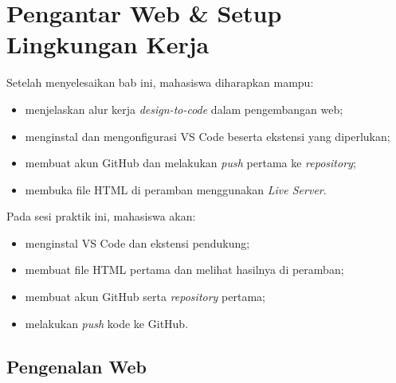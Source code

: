
\chapter{Pengantar Web \& Setup Lingkungan Kerja}
\label{chap:minggu-01}

\begin{capaian}
Setelah menyelesaikan bab ini, mahasiswa diharapkan mampu:
\begin{itemize}
  \item menjelaskan alur kerja \emph{design-to-code} dalam pengembangan web;
  \item menginstal dan mengonfigurasi VS Code beserta ekstensi yang diperlukan;
  \item membuat akun GitHub dan melakukan \emph{push} pertama ke \emph{repository};
  \item membuka file HTML di peramban menggunakan \emph{Live Server}.
\end{itemize}
\end{capaian}

\begin{tujuanpraktik}
Pada sesi praktik ini, mahasiswa akan:
\begin{itemize}
  \item menginstal VS Code dan ekstensi pendukung;
  \item membuat file HTML pertama dan melihat hasilnya di peramban;
  \item membuat akun GitHub serta \emph{repository} pertama;
  \item melakukan \emph{push} kode ke GitHub.
\end{itemize}
\end{tujuanpraktik}

\section{Pengenalan Web}
\label{sec:m01-pengenalan}

